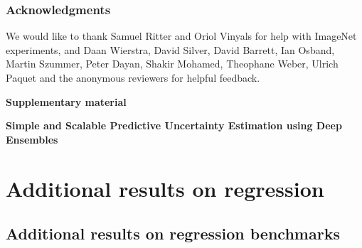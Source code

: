 \documentclass{article}
\begin{document}
{\clearpage
\newpage

\subsubsection*{Acknowledgments}
We would like to thank Samuel Ritter and Oriol Vinyals for help with ImageNet experiments, and 
Daan Wierstra,
 David Silver, 
David Barrett,
Ian Osband, 
Martin Szummer, 
Peter Dayan, 
Shakir Mohamed, 
 Theophane Weber,
 Ulrich Paquet 
 and the anonymous reviewers 
for helpful feedback.
}


%


\clearpage
\appendix
{\centerline{\Large{\textbf{Supplementary material}}}}
 \vspace{0.1in} {\centerline{\large{\textbf{ Simple and Scalable Predictive Uncertainty Estimation using Deep Ensembles}}}}





\section{Additional results on regression}

\subsection{Additional results on regression benchmarks}\label{sec:regression:additional}
\end{document}
